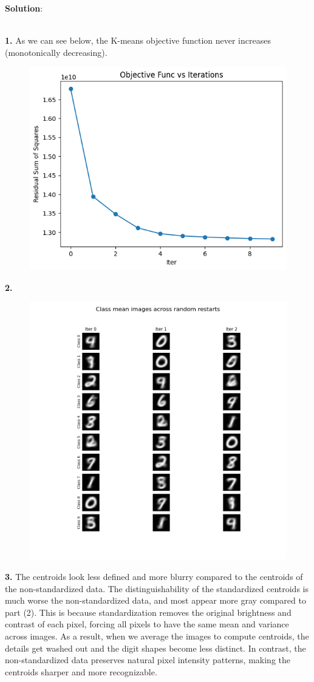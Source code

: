 \documentclass[submit]{../harvardml}
\newenvironment{solution}{
    \vspace{2mm}
    \color{blue}\noindent\textbf{Solution}:
}{}
\begin{document}
\begin{solution}
    \\
    \textbf{1. } As we can see below, the K-means objective function never increases (monotonically decreasing).
    \begin{figure}[H]
        \centering
        \includegraphics[width=0.8\linewidth]{hw4/img_output/p2.1.png}
    \end{figure}
    \textbf{2.} 
    \begin{figure}[H]
        \centering
        \includegraphics[width=0.6\linewidth]{hw4/img_output/p2.2.png}
    \end{figure}
    \textbf{3.} The centroids look less defined and more blurry compared to the centroids of the non-standardized data. The distinguishability of the standardized centroids is much worse the non-standardized data, and most appear more gray compared to part (2). This is because standardization removes the original brightness and contrast of each pixel, forcing all pixels to have the same mean and variance across images. As a result, when we average the images to compute centroids, the details get washed out and the digit shapes become less distinct. In contrast, the non-standardized data preserves natural pixel intensity patterns, making the centroids sharper and more recognizable.

\end{solution}
\end{document}
